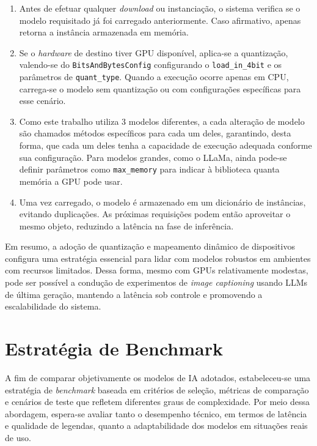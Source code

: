 \begin{enumerate}
    \item Antes de efetuar qualquer \textit{download} ou instanciação, o sistema verifica se o modelo requisitado já foi carregado anteriormente. Caso afirmativo, apenas retorna a instância armazenada em memória.
    \item Se o \textit{hardware} de destino tiver GPU disponível, aplica-se a quantização, valendo-se do \texttt{BitsAndBytesConfig} configurando o \texttt{load\_in\_4bit} e os parâmetros de \texttt{quant\_type}. Quando a execução ocorre apenas em CPU, carrega-se o modelo sem quantização ou com configurações específicas para esse cenário.
    \item Como este trabalho utiliza 3 modelos diferentes, a cada alteração de modelo são chamados métodos específicos para cada um deles, garantindo, desta forma, que cada um deles tenha a capacidade de execução adequada conforme sua configuração. Para modelos grandes, como o LLaMa, ainda pode-se definir parâmetros como \texttt{max\_memory} para indicar à biblioteca quanta memória a GPU pode usar.
    \item Uma vez carregado, o modelo é armazenado em um dicionário de instâncias, evitando duplicações. As próximas requisições podem então aproveitar o mesmo objeto, reduzindo a latência na fase de inferência.
\end{enumerate}

Em resumo, a adoção de quantização e mapeamento dinâmico de dispositivos configura uma estratégia essencial para lidar com modelos robustos em ambientes com recursos limitados. Dessa forma, mesmo com GPUs relativamente modestas, pode ser possível a condução de experimentos de \textit{image captioning} usando LLMs de última geração, mantendo a latência sob controle e promovendo a escalabilidade do sistema.

\section{Estratégia de Benchmark}

A fim de comparar objetivamente os modelos de IA adotados, estabeleceu-se uma estratégia de \textit{benchmark} baseada em critérios de seleção, métricas de comparação e cenários de teste que refletem diferentes graus de complexidade. Por meio dessa abordagem, espera-se avaliar tanto o desempenho técnico, em termos de latência e qualidade de legendas, quanto a adaptabilidade dos modelos em situações reais de uso.

